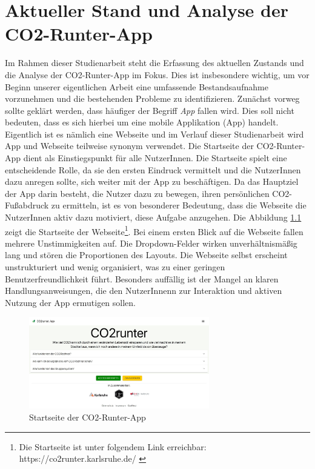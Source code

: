 
\chapter{Aktueller Stand und Analyse der CO2-Runter-App}
\label{chapter:2}

Im Rahmen dieser Studienarbeit steht die Erfassung des aktuellen Zustands und die Analyse der CO2-Runter-App im Fokus. Dies ist insbesondere wichtig, um vor Beginn unserer eigentlichen Arbeit eine umfassende Bestandsaufnahme vorzunehmen und die bestehenden Probleme zu identifizieren. Zunächst vorweg sollte geklärt werden, dass häufiger der Begriff \textit{App} fallen wird. Dies soll nicht bedeuten, dass es sich hierbei um eine mobile Applikation (App) handelt. Eigentlich ist es nämlich eine Webseite und im Verlauf dieser Studienarbeit wird App und Webseite teilweise synonym verwendet. Die Startseite der CO2-Runter-App dient als Einstiegspunkt für alle NutzerInnen. Die Startseite spielt eine entscheidende Rolle, da sie den ersten Eindruck vermittelt und die NutzerInnen dazu anregen sollte, sich weiter mit der App zu beschäftigen. Da das Hauptziel der App darin besteht, die Nutzer dazu zu bewegen, ihren persönlichen CO2-Fußabdruck zu ermitteln, ist es von besonderer Bedeutung, dass die Webseite die NutzerInnen aktiv dazu motiviert, diese Aufgabe anzugehen. Die Abbildung \ref{fig:co2runterapp-landingpage} zeigt die Startseite der Webseite\footnote{Die Startseite ist unter folgendem Link erreichbar: https://co2runter.karlsruhe.de/ \cite{co2runterapp}}. Bei einem ersten Blick auf die Webseite fallen mehrere Unstimmigkeiten auf. Die Dropdown-Felder wirken unverhältnismäßig lang und stören die Proportionen des Layouts. Die Webseite selbst erscheint unstrukturiert und wenig organisiert, was zu einer geringen Benutzerfreundlichkeit führt. Besonders auffällig ist der Mangel an klaren Handlungsanweisungen, die den NutzerInnenn zur Interaktion und aktiven Nutzung der App ermutigen sollen.

\begin{figure}[h]
    \centering
    \includegraphics[width=0.7\textwidth]{images/02/CO2-Runter-App-Landingpage.jpeg}
    \caption{Startseite der CO2-Runter-App}
    \label{fig:co2runterapp-landingpage}
\end{figure}


